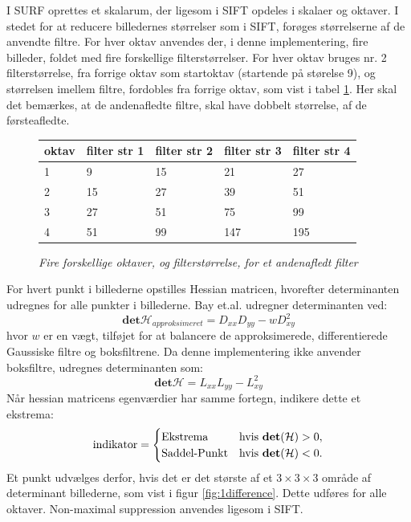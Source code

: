 I SURF oprettes et skalarum, der ligesom i SIFT opdeles i skalaer og oktaver. I stedet for at reducere billedernes størrelser som i SIFT, forøges størrelserne af de anvendte filtre. For hver oktav anvendes der, i denne implementering, fire billeder, foldet med fire forskellige filterstørrelser. For hver oktav bruges nr. 2 filterstørrelse, fra forrige oktav som startoktav (startende på størelse 9), og størrelsen imellem filtre, fordobles fra forrige oktav, som vist i tabel \ref{fig:secderivfiltersize}. Her skal det bemærkes, at de andenafledte filtre, skal have dobbelt størrelse, af de førsteafledte.
\begin{figure}[H]
    \centering
    \begin{center}    
    \begin{tabular}{ | l | l | l | l | l |}
    \hline
    oktav & filter str 1 & filter str 2 & filter str 3 & filter str 4 \\ \hline
    1 & 9 & 15 & 21 & 27 \\ \hline
  	2 & 15 & 27 & 39 & 51 \\ \hline
  	3 & 27 & 51 & 75 & 99 \\ \hline
  	4 & 51 & 99 & 147 & 195 \\ \hline
    \end{tabular}       
    \caption{{\footnotesize \textit{Fire forskellige oktaver, og filterstørrelse, for et andenafledt filter}}}
    \label{fig:secderivfiltersize}
     \end{center}
     \vspace{-2.5em}
  \end{figure} \noindent
For hvert punkt i billederne opstilles Hessian matricen, hvorefter determinanten udregnes for alle punkter i billederne. Bay et.al. udregner determinanten ved:
\begin{equation}
\textbf{det}\mathcal{H}_{approksimeret} = D_{xx}D_{yy}-wD_{xy}^2
\label{deerminantofhessian}
\end{equation}
hvor $w$ er en vægt, tilføjet for at balancere de approksimerede, differentierede Gaussiske filtre og boksfiltrene. Da denne implementering ikke anvender boksfiltre, udregnes determinanten som:
\begin{equation}
\textbf{det}\mathcal{H} = L_{xx}L_{yy}-L_{xy}^2
\label{deerminantofhessian}
\end{equation}
Når hessian matricens egenværdier har samme fortegn, indikere dette et ekstrema:
\begin{equation}
\begin{split}
\text{indikator} = 
\begin{cases}
\text{Ekstrema}& \text{hvis } \bold{det}(\mathcal{H}) > 0,  \\
\text{Saddel-Punkt} & \text{hvis } \bold{det}(\mathcal{H}) < 0.
\end{cases}
\end{split}
\label{detman}
\end{equation}
Et punkt udvælges derfor, hvis det er det største af et $3\times3\times3$ område af determinant billederne, som vist i figur \ref{fig:1difference}. Dette udføres for alle oktaver. Non-maximal suppression anvendes ligesom i SIFT.
